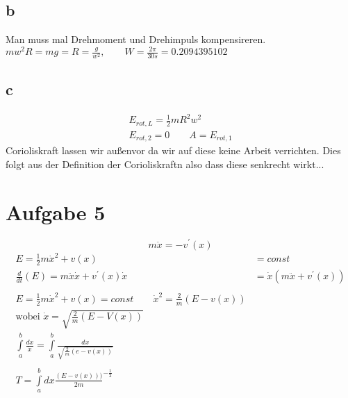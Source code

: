\documentclass[11pt]{article}
\begin{document}
\subsection{b}
Man muss mal Drehmoment und Drehimpuls kompensireren.
$mw^2 R = mg = R = 
\frac{g}{w^2} , \qquad W = \frac{2 \pi}{30s} = 0.2094395102$  
\subsection{c}
\begin{align*}
	E_{rot,L} = \frac{1}{2} mR^2 w^2\\
	E_{rot, 2} = 0 \qquad A = E_{rot , 1}
\end{align*}
Corioliskraft lassen wir außenvor da wir auf diese keine Arbeit verrichten. Dies folgt aus der Definition der Corioliskraftn also dass diese senkrecht wirkt...

\section{Aufgabe 5}
	\[ m \ddot{x} = - v^\prime (x) \]
	\begin{align*}
		E = \frac{1}{2} m \dot{x}^2 + v(x) &= const\\
		\frac{d}{dt} (E) = m\ddot{x} \dot{x} + v^\prime (x) \dot{x} &= \dot{x} (m \ddot{x} + v^\prime(x))\\\\
		E = \frac{1}{2} m \dot{x}^2 + v(x) = const \qquad \dot{x}^2 = \frac{2}{m} (E - v(x))\\
		\text{wobei } \dot{x} = \sqrt{\frac{2}{m} (E - V (x))}\\
		\int\limits_{a}^{b} \frac{dx}{\dot{x}} = \int\limits_{a}^{b}\frac{dx}{\sqrt{\frac{2}{m} (e- v(x))}}\\\\
		T = \int\limits_{a}^{b} dx \frac{(E-v(x)))}{2m}^{-\frac{1}{2}}
  	\end{align*}
  	
\end{document}

